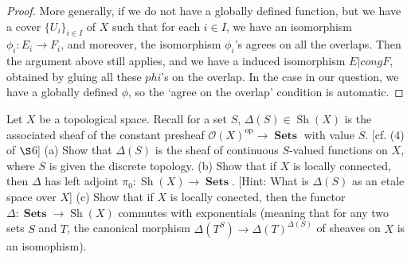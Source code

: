 \documentclass[a4paper]{article}
\DeclareMathOperator{\Sets}{\mathbf {Sets}}
\DeclareMathOperator{\op}{op}
\DeclareMathOperator{\Sh}{\text {Sh}}
\begin{document}
\begin{proof}
    More generally, if we do not have a globally defined function, but we have a cover $\{U_i\}_{i\in I}$ of $X$ such that for each $i\in I$, we have an isomorphism $\phi_i:E_i\to F_i$, and moreover, the isomorphism $\phi_i$'s agrees on all the overlaps. Then the argument above still applies, and we have a induced isomorphism $E|cong F$, obtained by gluing all these $phi$'s on the overlap. In the case in our question, we have a globally defined $\phi$, so the `agree on the overlap' condition is automatic.    
    
    



\end{proof}
\begin{question}
    Let $X$ be a topological space. Recall for a set $S$, $\Delta(S)\in \Sh(X)$ is the associated sheaf of the constant presheaf ${\mathcal O}(X)^{\op}\to\Sets$ with value $S$. [cf. (4) of $\S$6]\newline
    (a) Show that $\Delta(S)$ is the sheaf of continuous $S$-valued functions on $X$, where $S$ is given the discrete topology. \newline
    (b) Show that if $X$ is locally connected, then $\Delta$ has left adjoint $\pi_0:\Sh(X)\to \Sets$. [Hint: What is $\Delta(S)$ as an etale space over $X$]\newline
    (c) Show that if $X$ is locally conected, then the functor $\Delta: \Sets\to \Sh(X)$ commutes with exponentials (meaning that for any two sets $S$ and $T$, the canonical morphism $\Delta(T^S)\to \Delta(T)^{\Delta(S)}$ of sheaves on $X$ is an isomophism).
\end{question}
\end{document}
